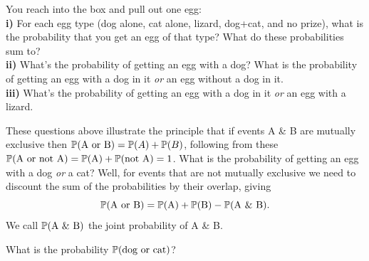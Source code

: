 \begin{question}
You reach into the box and pull out one egg:\\
{\bf i)} For each egg type (dog alone, cat alone, lizard, dog+cat, and no prize),
what is the probability that you get an egg of that type? What do these probabilities sum to?\\
{\bf ii)} What's the probability of getting an egg with a dog? What is
the probability of getting an egg with a dog in it {\it or} an egg without a dog in it. \\
{\bf iii)} What's the probability of getting an egg with a dog in it {\it or} an egg with a lizard. \\
\end{question}
These questions above illustrate the principle that if events A \& B
are mutually exclusive then $\P(\textrm{A or B}) = \P(A) + \P(B)$,
following from these $\P(\textrm{A or not A}) = \P(\textrm{A}) + \P(\textrm{not A}) =
1$. What is the probability of getting an egg with a dog {\it or} a
cat?  Well, for events that are not mutually exclusive we need to
discount the sum of the probabilities by their overlap, giving
\begin{equation}
\P(\textrm{A or B}) = \P(\textrm{A}) +\P(\textrm{B}) - \P(\textrm{A \& B}).
\end{equation}
We call $ \P(\textrm{A \& B}) $ the joint probability of A \& B.
\begin{question}
What is the probability $\P(\textrm{dog or cat})$?
\end{question}


